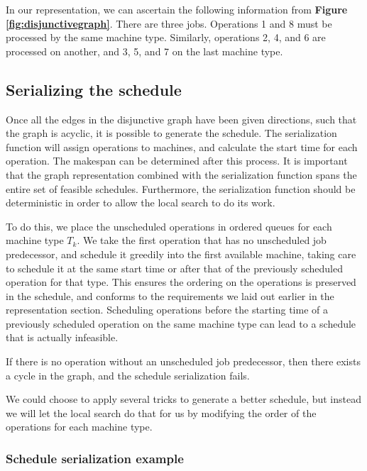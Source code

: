 \documentclass[a4paper,10pt]{article}
\begin{document}
In our representation, we can ascertain the following information from \textbf{Figure \ref{fig:disjunctivegraph}}. There are three jobs. Operations 1 and 8 must be processed by the same machine type. Similarly, operations 2, 4, and 6 are processed on another, and 3, 5, and 7 on the last machine type.

\subsection{Serializing the schedule}

Once all the edges in the disjunctive graph have been given directions, such that the graph is acyclic, it is possible to generate the schedule. The serialization function will assign operations to machines, and calculate the start time for each operation. The makespan can be determined after this process. It is important that the graph representation combined with the serialization function spans the entire set of feasible schedules. Furthermore, the serialization function should be deterministic in order to allow the local search to do its work.

To do this, we place the unscheduled operations in ordered queues for each machine type $T_k$. We take the first operation that has no unscheduled job predecessor, and schedule it greedily into the first available machine, taking care to schedule it at the same start time or after that of the previously scheduled operation for that type. This ensures the ordering on the operations is preserved in the schedule, and conforms to the requirements we laid out earlier in the representation section. Scheduling operations before the starting time of a previously scheduled operation on the same machine type can lead to a schedule that is actually infeasible.

If there is no operation without an unscheduled job predecessor, then there exists a cycle in the graph, and the schedule serialization fails.

We could choose to apply several tricks to generate a better schedule, but instead we will let the local search do that for us by modifying the order of the operations for each machine type.

\subsubsection{Schedule serialization example}
\end{document}
